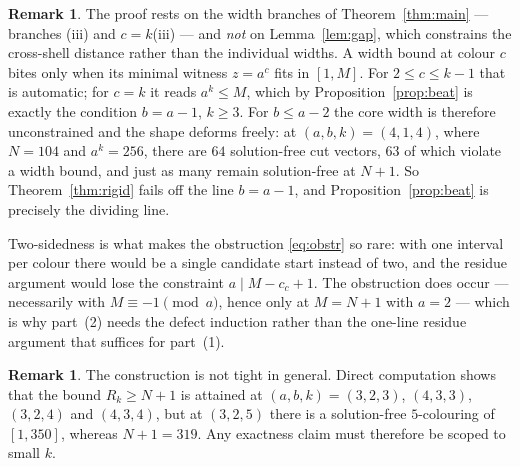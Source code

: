 \documentclass{amsart}
\theoremstyle{definition}
\newtheorem{remark}[theorem]{Remark}
\newcommand{\Rk}{R_k}
\begin{document}
\begin{remark}\label{rem:rigid}
The proof rests on the width branches of Theorem~\ref{thm:main} --- branches
(iii) and $c=k$(iii) --- and \emph{not} on Lemma~\ref{lem:gap}, which
constrains the cross-shell distance rather than the individual widths.  A width
bound at colour $c$ bites only when its minimal witness $z=a^{c}$ fits in
$[1,M]$.  For $2\le c\le k-1$ that is automatic; for $c=k$ it reads
$a^{k}\le M$, which by Proposition~\ref{prop:beat} is exactly the condition
$b=a-1$, $k\ge3$.  For $b\le a-2$ the core width is therefore unconstrained and
the shape deforms freely: at $(a,b,k)=(4,1,4)$, where $N=104$ and $a^{k}=256$,
there are $64$ solution-free cut vectors, $63$ of which violate a width bound,
and just as many remain solution-free at $N+1$.  So Theorem~\ref{thm:rigid}
fails off the line $b=a-1$, and Proposition~\ref{prop:beat} is precisely the
dividing line.

Two-sidedness is what makes the obstruction \eqref{eq:obstr} so rare: with one
interval per colour there would be a single candidate start instead of two, and
the residue argument would lose the constraint $a\mid M-c_c+1$.  The
obstruction does occur --- necessarily with $M\equiv-1\pmod a$, hence only at
$M=N+1$ with $a=2$ --- which is why part~(2) needs the defect induction rather
than the one-line residue argument that suffices for part~(1).
\end{remark}



\begin{remark}
The construction is not tight in general.  Direct computation shows that the
bound $\Rk\ge N+1$ is attained at $(a,b,k)=(3,2,3)$, $(4,3,3)$, $(3,2,4)$ and
$(4,3,4)$, but at $(3,2,5)$ there is a solution-free $5$-colouring of $[1,350]$,
whereas $N+1=319$.  Any exactness claim must therefore be scoped to small $k$.
\end{remark}
\end{document}
